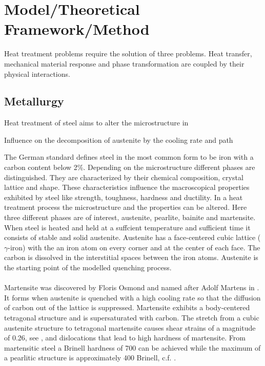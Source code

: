 \chapter{Model/Theoretical Framework/Method}
\thispagestyle{fancy}
\label{chap:model}
Heat treatment problems require the solution of three problems. Heat transfer, mechanical material response and phase transformation are coupled by their physical interactions. 

\section{Metallurgy}
Heat treatment of steel aims to alter the microstructure in 

Influence on the decomposition of austenite by the cooling rate and path

The German standard \cite{din_en_10020_din_2000} defines steel in the most common form to be iron with a carbon content below 2\%. Depending on the microstructure different phases are distinguished. They are characterized by their chemical composition, crystal lattice and shape. These characteristics influence the macroscopical properties exhibited by steel like strength, toughness, hardness and ductility. In a heat treatment process the microstructure  and the properties can be altered. 
Here three different phases are of interest, austenite, pearlite, bainite and martensite. 
When steel is heated and held at a suffcient temperature and sufficient time it consists of stable and solid austenite. Austenite has a face-centered cubic lattice ($\gamma$-iron) with the an iron atom on every corner and at the center of each face. The carbon is dissolved in the interstitial spaces between the iron atoms. Austenite is the starting point of the modelled quenching process. \\ \\
Martensite was discovered by Floris Osmond and named after Adolf Martens in \cite{osmond_microscopic_1904}. It forms when austenite is quenched with a high cooling rate so that the diffusion of carbon out of the lattice is suppressed. 
Martensite exhibits a body-centered tetragonal structure and is supersaturated with carbon. The stretch from a cubic austenite structure to tetragonal martensite causes shear strains of a magnitude of 0.26, see \cite{bhadeshia_worked_2001}, and dislocations that lead to high hardness of martensite. From martensitic steel a Brinell hardness of 700 can be achieved while the maximum of a pearlitic structure is approximately 400 Brinell, c.f. \cite{eugene_a_avallone_iron_2007}. \\

